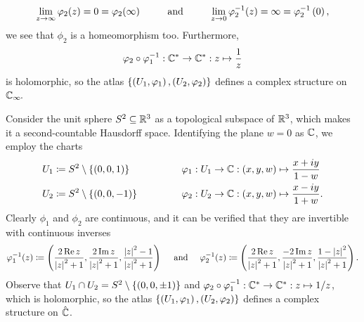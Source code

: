 \documentclass[../Moduli_Spaces_of_Riemann_Surfaces.tex]{subfiles}
\begin{document}
\begin{example}
        \begin{equation*}
            \lim\limits_{z\to\infty}\phi_2\!\l(z\r)=0=\phi_2\!\l(\infty\r)\ \ \ \ \ \ \ \ \textrm{and}\ \ \ \ \ \ \ \ \lim\limits_{z\to0}\phi_2^{-1}\!\l(z\r)=\infty=\phi_2^{-1}\l(0\r),
        \end{equation*}
        we see that $\phi_2$ is a homeomorphism too. Furthermore,
        \begin{equation*}
            \varphi_2\circ\varphi_1^{-1}:\mathbb{C}^\ast\to\mathbb{C}^\ast:z\mapsto\frac{1}{z}
        \end{equation*}
        is holomorphic, so the atlas $\left\{\left(U_1,\varphi_1\right),\left(U_2,\varphi_2\right)\right\}$ defines a complex structure on $\mathbb{C}_\infty\!$.\exqed
    \end{example}
    \begin{example}\label{1.1:exa:stereographic_projection}
        Consider the unit sphere $S^2\subseteq\mathbb{R}^3$ as a topological subspace of $\mathbb{R}^3$, which makes it a second-countable Hausdorff space. Identifying the plane $w=0$ as $\mathbb{C}$, we employ the charts
        \begin{equation*}
            \begin{alignedat}{2}
                U_1&\coloneqq S^2\comp\l\{\l(0,0,1\r)\r\}\ \ \ \ \ \ \ \ \ \ \ \ \ \ \ \ &&\phi_1:U_1\to\C:\tpl{x,y,w}\mapsto\frac{x+iy}{1-w} \\
                U_2&\coloneqq S^2\comp\l\{\l(0,0,-1\r)\r\}&&\phi_2:U_2\to\C:\tpl{x,y,w}\mapsto\frac{x-iy}{1+w}.
            \end{alignedat}
        \end{equation*}
        Clearly $\phi_1$ and $\phi_2$ are continuous, and it can be verified that they are invertible with continuous inverses
        \begin{equation*}
            \phi_1^{-1}\!\l(z\r)\coloneqq\tpl{\frac{2\Re z}{\l|z\r|^2+1},\frac{2\Im z}{\l|z\r|^2+1},\frac{\l|z\r|^2-1}{\l|z\r|^2+1}}\ \ \ \ \textrm{and}\ \ \ \ \phi_2^{-1}\!\l(z\r)\coloneqq\tpl{\frac{2\Re z}{\l|z\r|^2+1},\frac{-2\Im z}{\l|z\r|^2+1},\frac{1-\l|z\r|^2}{\l|z\r|^2+1}}.
        \end{equation*}
        Observe that $U_1\cap U_2=S^2\setminus\left\{\left(0,0,\pm1\right)\right\}$ and $\varphi_2\circ\varphi_1^{-1}:\mathbb{C}^\ast\to\mathbb{C}^\ast:z\mapsto1/z$, which is holomorphic, so the atlas $\left\{\left(U_1,\varphi_1\right),\left(U_2,\varphi_2\right)\right\}$ defines a complex structure on $\hat{\mathbb{C}}$.\exqed
    \end{example}
\end{document}
